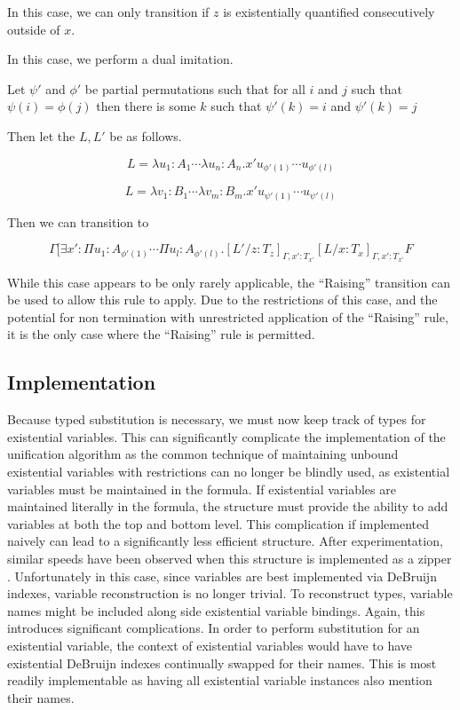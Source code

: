 In this case, we can only transition if $z$ is existentially 
quantified consecutively outside of $x$.

In this case, we perform a dual imitation.

Let $\psi'$ and $\phi'$ be partial permutations 
such that for all $i$ and $j$ such that
$\psi(i) = \phi(j)$ then there is some $k$ such that
$\psi'(k) = i$ and $\psi'(k) = j$

Then let the $L,L'$ be as follows.

\[
L = \lambda u_1 : A_1 \cdots \lambda u_n : A_n . x' u_{\phi'(1)} \cdots u_{\phi'(l)}
\]

\[
L = \lambda v_1 : B_1 \cdots \lambda v_m : B_m . x' u_{\psi'(1)} \cdots u_{\psi'(l)}
\]

Then we can transition to

\[
\Gamma [ \exists x' : \Pi u_1 : A_{\phi'(1) } \cdots \Pi u_l : A_{\phi'(l)}
. [L'/z : T_z]_{\Gamma, x': T_{x'}}[L / x : T_x]_{\Gamma, x': T_{x'}} F
\]
 
While this case appears to be only rarely applicable,
the ``Raising'' transition can be used to allow this rule to apply.
Due to the restrictions of this case, and the potential
for non termination with unrestricted application of the ``Raising'' rule,
it is the only case where the ``Raising'' rule is permitted.  


\subsection{Implementation}

Because typed substitution is necessary, we must now keep track of types for existential variables.  
This can significantly complicate the implementation of the unification algorithm
as the common technique of maintaining unbound existential variables with restrictions
can no longer be blindly used, as existential variables must be maintained in the 
formula.  If existential variables are maintained literally in the formula, 
the structure must provide the ability to add variables at both the top and bottom level.
This complication if implemented naively can lead to a significantly less efficient structure.
After experimentation, similar speeds have been observed when this structure is implemented
as a zipper \citep{huet1997functional}.  Unfortunately in this case, since variables are best 
implemented via DeBruijn indexes, variable reconstruction is no longer trivial. 
To reconstruct types, variable names might be included along side existential variable bindings.  
Again, this introduces significant complications.  In order to perform 
substitution for an existential variable, the context of existential variables would have to have
existential DeBruijn indexes continually swapped for their names.  
This is most readily implementable as having all existential variable instances 
also mention their names.

